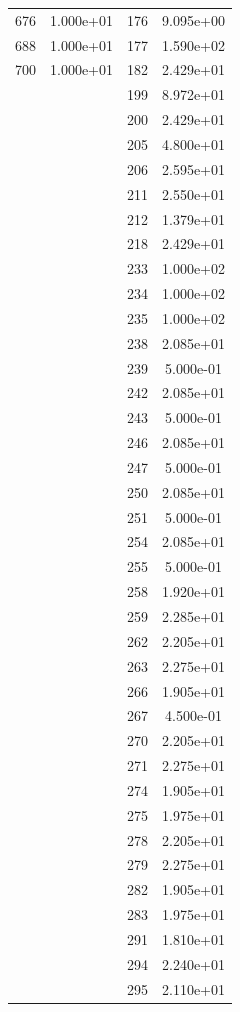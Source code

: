\documentclass[12pt]{article}
\begin{document}
\begin{longtable}{@{}cccc@{}}
676 & 1.000e+01 & 176 & 9.095e+00 \\
688 & 1.000e+01 & 177 & 1.590e+02 \\
700 & 1.000e+01 & 182 & 2.429e+01 \\
 &  & 199 & 8.972e+01 \\
 &  & 200 & 2.429e+01 \\
 &  & 205 & 4.800e+01 \\
 &  & 206 & 2.595e+01 \\
 &  & 211 & 2.550e+01 \\
 &  & 212 & 1.379e+01 \\
 &  & 218 & 2.429e+01 \\
 &  & 233 & 1.000e+02 \\
 &  & 234 & 1.000e+02 \\
 &  & 235 & 1.000e+02 \\
 &  & 238 & 2.085e+01 \\
 &  & 239 & 5.000e-01 \\
 &  & 242 & 2.085e+01 \\
 &  & 243 & 5.000e-01 \\
 &  & 246 & 2.085e+01 \\
 &  & 247 & 5.000e-01 \\
 &  & 250 & 2.085e+01 \\
 &  & 251 & 5.000e-01 \\
 &  & 254 & 2.085e+01 \\
 &  & 255 & 5.000e-01 \\
 &  & 258 & 1.920e+01 \\
 &  & 259 & 2.285e+01 \\
 &  & 262 & 2.205e+01 \\
 &  & 263 & 2.275e+01 \\
 &  & 266 & 1.905e+01 \\
 &  & 267 & 4.500e-01 \\
 &  & 270 & 2.205e+01 \\
 &  & 271 & 2.275e+01 \\
 &  & 274 & 1.905e+01 \\
 &  & 275 & 1.975e+01 \\
 &  & 278 & 2.205e+01 \\
 &  & 279 & 2.275e+01 \\
 &  & 282 & 1.905e+01 \\
 &  & 283 & 1.975e+01 \\
 &  & 291 & 1.810e+01 \\
 &  & 294 & 2.240e+01 \\
 &  & 295 & 2.110e+01 \\

\end{longtable}
\end{document}
